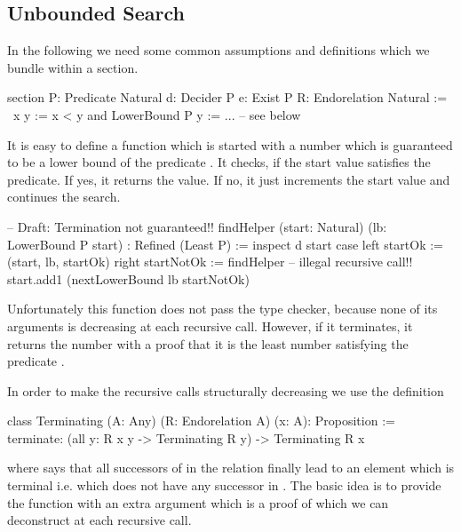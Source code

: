 \vskip 5mm
\subsection{Unbounded Search}

In the following we need some common assumptions and definitions which we
bundle within a section.

\begin{alba}
    section
        P: Predicate Natural
        d: Decider P
        e: Exist P
        R: Endorelation Natural :=
            \ x y := x < y and LowerBound P y
    :=
        ...  -- see below
\end{alba}

It is easy to define a function  which is started with a number
which is guaranteed to be a lower bound of the predicate . It checks, if
the start value satisfies the predicate. If yes, it returns the value. If no, it
just increments the start value and continues the search.
%
\begin{alba}
    -- Draft: Termination not guaranteed!!
    findHelper (start: Natural) (lb: LowerBound P start) : Refined (Least P) :=
        inspect d start case
            left startOk :=
                (start, lb, startOk)
            right startNotOk :=
                findHelper  -- illegal recursive call!!
                    start.add1
                    (nextLowerBound lb startNotOk)
\end{alba}
%
Unfortunately this function does not pass the type checker, because none of its
arguments is decreasing at each recursive call. However, if it terminates, it
returns the number with a proof that it is the least number satisfying the
predicate .

In order to make the recursive calls structurally decreasing we use the
definition
%
\begin{alba}
    class Terminating (A: Any) (R: Endorelation A) (x: A): Proposition :=
        terminate:
            (all y: R x y -> Terminating R y)
            -> Terminating R x
\end{alba}
%
where  says that all successors of  in the
relation  finally lead to an element which is terminal i.e. which does
not have any successor in . The basic idea is to provide the function
 with an extra argument which is a proof of  which we can deconstruct at each recursive call.



